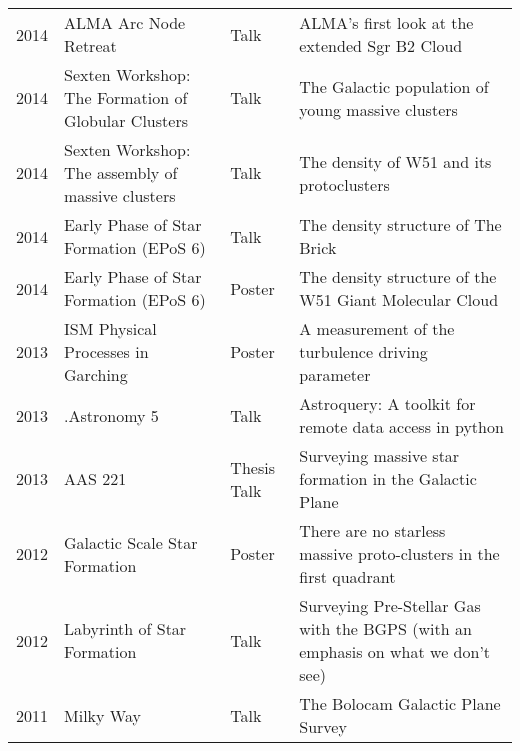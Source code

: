 \begin{tabular}{cp{1.8in}p{1.5cm}p{3.0in}}
    2014 &      ALMA Arc Node Retreat  & Talk & ALMA's first look at the extended Sgr B2 Cloud \\
    2014 &      Sexten Workshop: The Formation of Globular Clusters  & Talk & The Galactic population of young massive clusters \\
    2014 &      Sexten Workshop: The assembly of massive clusters  & Talk & The density of W51 and its protoclusters \\
    2014 &      Early Phase of Star Formation (EPoS 6)  & Talk & The density structure of The Brick \\
    2014 &      Early Phase of Star Formation (EPoS 6)  & Poster & The density structure of the W51 Giant Molecular Cloud \\
    2013 &      ISM Physical Processes in Garching  & Poster & A measurement of the turbulence driving parameter \\
    2013 &      .Astronomy 5  & Talk & Astroquery: A toolkit for remote data access in python \\
    2013 &      AAS 221  & Thesis Talk & Surveying massive star formation in the Galactic Plane \\
    2012 &      Galactic Scale Star Formation  & Poster& There are no starless massive proto-clusters in the first quadrant \\
    2012 &      Labyrinth of Star Formation  &  Talk& Surveying Pre-Stellar Gas with the BGPS (with an emphasis on what we don't see) \\
    2011 &      Milky Way  & Talk& The Bolocam Galactic Plane Survey \\
\end{tabular}

